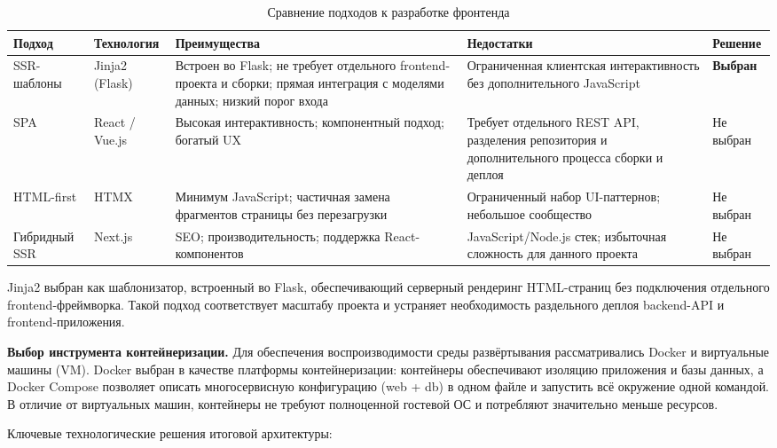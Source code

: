 \begin{table}[ht!]
    \centering
    \caption{Сравнение подходов к разработке фронтенда}
    \label{tab:frontend}
    \small
    \begin{tabularx}{\textwidth}{|p{2.5cm}|p{2.3cm}|X|X|p{2.2cm}|}
        \hline
        \textbf{Подход} & \textbf{Технология} & \textbf{Преимущества} & \textbf{Недостатки} & \textbf{Решение} \\ \hline
        SSR-шаблоны &
        Jinja2 (Flask) &
        Встроен во Flask; не требует отдельного frontend-проекта и сборки;
        прямая интеграция с моделями данных; низкий порог входа &
        Ограниченная клиентская интерактивность без дополнительного JavaScript &
        \textbf{Выбран} \\ \hline
        SPA &
        React / Vue.js &
        Высокая интерактивность; компонентный подход; богатый UX &
        Требует отдельного REST API, разделения репозитория и дополнительного
        процесса сборки и деплоя &
        Не выбран \\ \hline
        HTML-first &
        HTMX &
        Минимум JavaScript; частичная замена фрагментов страницы без перезагрузки &
        Ограниченный набор UI-паттернов; небольшое сообщество &
        Не выбран \\ \hline
        Гибридный SSR &
        Next.js &
        SEO; производительность; поддержка React-компонентов &
        JavaScript/Node.js стек; избыточная сложность для данного проекта &
        Не выбран \\ \hline
    \end{tabularx}
\end{table}

Jinja2 выбран как шаблонизатор, встроенный во Flask,
обеспечивающий серверный рендеринг HTML-страниц без подключения отдельного
frontend-фреймворка. Такой подход соответствует масштабу проекта и устраняет
необходимость раздельного деплоя backend-API и frontend-приложения.

\textbf{Выбор инструмента контейнеризации.} Для обеспечения воспроизводимости
среды развёртывания рассматривались Docker и виртуальные машины (VM).
Docker выбран в качестве платформы контейнеризации: контейнеры
обеспечивают изоляцию приложения и базы данных, а Docker Compose позволяет
описать многосервисную конфигурацию (web + db) в одном файле и запустить
всё окружение одной командой. В отличие от виртуальных машин, контейнеры
не требуют полноценной гостевой ОС и потребляют значительно меньше ресурсов.

Ключевые технологические решения итоговой архитектуры:

